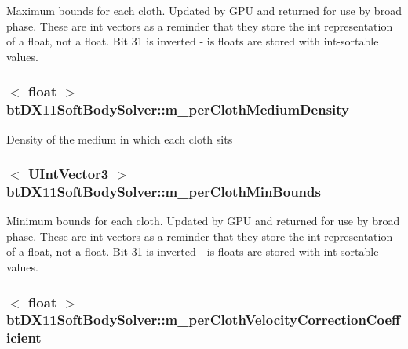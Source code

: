 Maximum bounds for each cloth. Updated by G\+P\+U and returned for use by broad phase. These are int vectors as a reminder that they store the int representation of a float, not a float. Bit 31 is inverted -\/ is floats are stored with int-\/sortable values. \hypertarget{classbt_d_x11_soft_body_solver_aebb8e95bf8685fed06cd8a66185e066a}{
\subsubsection[{m\+\_\+per\+Cloth\+Medium\+Density}]{$<$ float $>$ bt\+D\+X11\+Soft\+Body\+Solver\+::m\+\_\+per\+Cloth\+Medium\+Density\hspace{0.3cm}{\ttfamily [protected]}}}\label{classbt_d_x11_soft_body_solver_aebb8e95bf8685fed06cd8a66185e066a}
Density of the medium in which each cloth sits \hypertarget{classbt_d_x11_soft_body_solver_a33d4d4714b9f20c781d059aeaaf629db}{
\subsubsection[{m\+\_\+per\+Cloth\+Min\+Bounds}]{$<$ {\bf U\+Int\+Vector3} $>$ bt\+D\+X11\+Soft\+Body\+Solver\+::m\+\_\+per\+Cloth\+Min\+Bounds\hspace{0.3cm}{\ttfamily [protected]}}}\label{classbt_d_x11_soft_body_solver_a33d4d4714b9f20c781d059aeaaf629db}
Minimum bounds for each cloth. Updated by G\+P\+U and returned for use by broad phase. These are int vectors as a reminder that they store the int representation of a float, not a float. Bit 31 is inverted -\/ is floats are stored with int-\/sortable values. \hypertarget{classbt_d_x11_soft_body_solver_ada99231e53db3fad0b91154fbc14e867}{
\subsubsection[{m\+\_\+per\+Cloth\+Velocity\+Correction\+Coefficient}]{$<$ float $>$ bt\+D\+X11\+Soft\+Body\+Solver\+::m\+\_\+per\+Cloth\+Velocity\+Correction\+Coefficient\hspace{0.3cm}{\ttfamily [protected]}}}\label{classbt_d_x11_soft_body_solver_ada99231e53db3fad0b91154fbc14e867}
